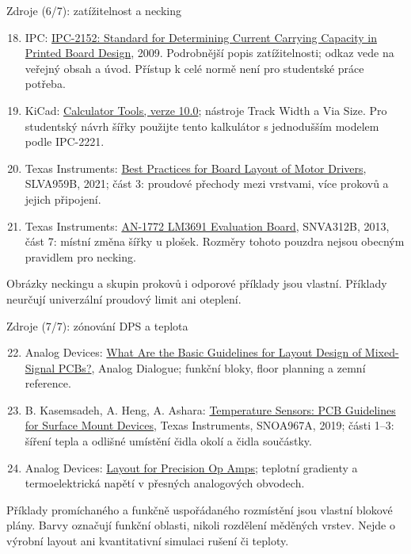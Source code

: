 \documentclass{beamer}
\begin{document}
\begin{frame}[t]{Zdroje (6/7): zatížitelnost a necking}
	\footnotesize
	\begin{enumerate}
		\setcounter{enumi}{17}
		\item IPC: \href{https://www.ipc.org/TOC/IPC-2152.pdf}{IPC-2152: Standard for Determining Current Carrying Capacity in Printed Board Design}, 2009. Podrobnější popis zatížitelnosti; odkaz vede na veřejný obsah a úvod. Přístup k celé normě není pro studentské práce potřeba.
		\item KiCad: \href{https://docs.kicad.org/10.0/en/pcb_calculator/pcb_calculator.html}{Calculator Tools, verze 10.0}; nástroje Track Width a Via Size. Pro studentský návrh šířky použijte tento kalkulátor s jednodušším modelem podle IPC-2221.
		\item Texas Instruments: \href{https://www.ti.com/lit/an/slva959b/slva959b.pdf}{Best Practices for Board Layout of Motor Drivers}, SLVA959B, 2021; část 3: proudové přechody mezi vrstvami, více prokovů a jejich připojení.
		\item Texas Instruments: \href{https://www.ti.com/lit/ug/snva312b/snva312b.pdf}{AN-1772 LM3691 Evaluation Board}, SNVA312B, 2013, část 7: místní změna šířky u plošek. Rozměry tohoto pouzdra nejsou obecným pravidlem pro necking.
	\end{enumerate}
	\medskip
	{\scriptsize Obrázky neckingu a skupin prokovů i odporové příklady jsou vlastní. Příklady neurčují univerzální proudový limit ani oteplení.}
\end{frame}

\begin{frame}[t]{Zdroje (7/7): zónování DPS a teplota}
	\footnotesize
	\begin{enumerate}
		\setcounter{enumi}{21}
		\item Analog Devices: \href{https://www.analog.com/en/resources/analog-dialogue/articles/what-are-the-basic-guidelines-for-layout-design-of-mixed-signal-pcbs.html}{What Are the Basic Guidelines for Layout Design of Mixed-Signal PCBs?}, Analog Dialogue; funkční bloky, floor planning a zemní reference.
		\item B. Kasemsadeh, A. Heng, A. Ashara: \href{https://www.ti.com/lit/an/snoa967a/snoa967a.pdf}{Temperature Sensors: PCB Guidelines for Surface Mount Devices}, Texas Instruments, SNOA967A, 2019; části 1--3: šíření tepla a odlišné umístění čidla okolí a čidla součástky.
		\item Analog Devices: \href{https://www.analog.com/en/resources/technical-articles/layout-for-precision-op-amps.html}{Layout for Precision Op Amps}; teplotní gradienty a termoelektrická napětí v přesných analogových obvodech.
	\end{enumerate}
	\medskip
	{\scriptsize Příklady promíchaného a funkčně uspořádaného rozmístění jsou vlastní blokové plány. Barvy označují funkční oblasti, nikoli rozdělení měděných vrstev. Nejde o výrobní layout ani kvantitativní simulaci rušení či teploty.}
\end{frame}
\end{document}

